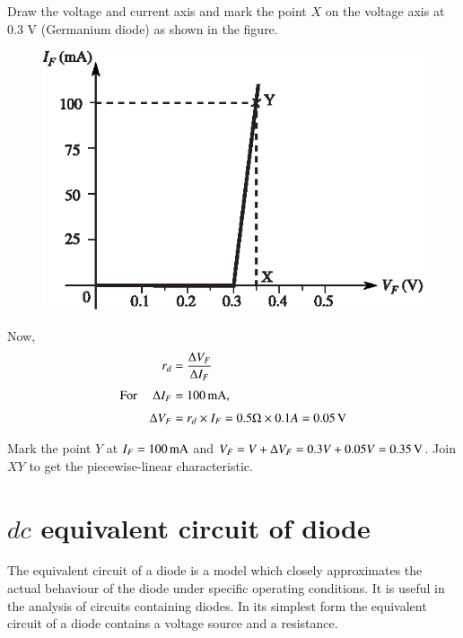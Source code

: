 \begin{solution}
Draw the voltage and current axis and mark the point $X$ on the
voltage axis at 0.3 V (Germanium diode) as shown in the figure.
\begin{figure}[H]
\centering
\includegraphics{chap1/S3-EE-01-027.eps}
\end{figure}

Now,
\begin{align*}
r_d & = \frac{\Delta V_F}{\Delta I_F}\\[3pt]
\text{For } \quad \Delta I_F & = 100 \operatorname{mA},\\[3pt]
\Delta V_F & = r_d \times I_F = 0.5\Omega \times 0.1A = 0.05 \operatorname{\mathrm{V}}
\end{align*}

Mark the point $Y$ at $I_F = 100\operatorname{mA}$ and $V_F = V + \Delta V_F = 0.3V +
0.05V = 0.35 \operatorname{\mathrm{V}}$. Join $XY$ to get the piecewise-linear characteristic.
\end{solution}

\section[$dc$ equivalent circuit of diode]{\boldmath$dc$ equivalent circuit of diode}\label{sec1.15}

The equivalent circuit of a diode is a model which closely approximates the actual behaviour of the diode under specific operating conditions. It is useful in the analysis of circuits containing diodes. In its simplest form the equivalent circuit of a diode contains a voltage source and a resistance.

